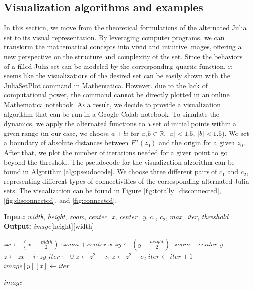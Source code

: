 \documentclass{amsart}
\theoremstyle{plain}
\theoremstyle{definition}
\theoremstyle{remark}
\numberwithin{equation}{section}
\newcommand{\R}{\mathbb{R}}
\begin{document}
  \subsection{Visualization algorithms and examples}
  In this section, we move from the theoretical formulations of the alternated Julia set to its visual representation. By leveraging computer programs, we can transform the mathematical concepts into vivid and intuitive images, offering a new perspective on the structure and complexity of the set.
  Since the behaviors of a filled Julia set can be modeled by the corresponding quartic function, it seems like the visualizations of the desired set can be easily shown with the JuliaSetPlot command in Mathematica. However, due to the lack of computational power, the command cannot be directly plotted in an online Mathematica notebook. As a result, we decide to provide a visualization algorithm that can be run in a Google Colab notebook. To simulate the dynamics, we apply the alternated functions to a set of initial points within a given range (in our case, we choose $a+bi$ for $a, b\in\R$, $|a| < 1.5$, $|b| < 1.5$). We set a boundary of absolute distances between $F^n(z_0)$ and the origin for a given $z_0$. After that, we plot the number of iterations needed for a given point to go beyond the threshold. The pseudocode for the visualization algorithm can be found in Algorithm \ref{alg:pseudocode}. We choose three different pairs of $c_1$ and $c_2$, representing different types of connectivities of the corresponding alternated Julia sets. The visualization can be found in Figure \ref{fig:totally_disconnected}, \ref{fig:disconnected}, and \ref{fig:connected}. \\
  \begin{algorithm}
\caption{Alternated Julia sets visualization}
\label{alg:pseudocode}
\begin{algorithmic}
\State \textbf{Input:} \textit{width}, \textit{height}, \textit{zoom}, \textit{center\_x}, \textit{center\_y}, \textit{$c_1$}, \textit{$c_2$}, \textit{max\_iter}, \textit{threshold}
\State \textbf{Output:} \textit{image}[height][width]

        \State $zx \gets (x - \frac{width}{2}) \cdot zoom + center\_x$
        \State $zy \gets (y - \frac{height}{2}) \cdot zoom + center\_y$
        \State $z \gets zx + i \cdot zy$
        \State $iter \gets 0$
                \State $z \gets z^{2} + c_1$
            \Else
                \State $z \gets z^{2} + c_2$
            \EndIf   
            \State $iter \gets iter + 1$
        \EndWhile
        \State $image[y][x] \gets iter$
    \EndFor
\EndFor

\State \Return $image$
\end{algorithmic}
\end{algorithm}
\end{document}
